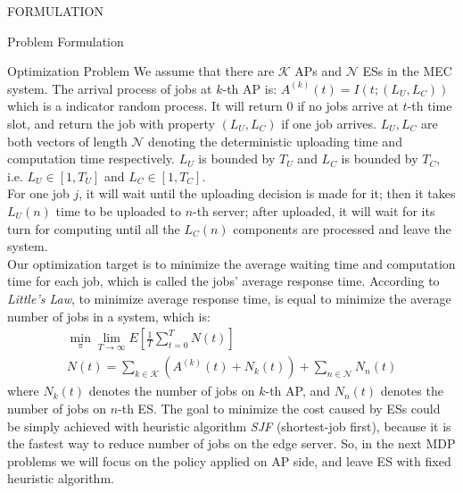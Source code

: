 \documentclass[10pt, conference, letterpaper]{IEEEtran}
\begin{document}
\begin{section}{FORMULATION}
\begin{subsection}{Problem Formulation}
            \begin{subsubsection}{Optimization Problem}
                We assume that there are $\mathcal{K}$ APs and $\mathcal{N}$ ESs in the MEC system.
                The arrival process of jobs at $k$-th AP is: $A^{(k)}(t)=I(t; (L_U, L_C))$ which is a indicator random process. It will return $0$ if no jobs arrive at $t$-th time slot, and return the job with property $(L_U, L_C)$ if one job arrives. $L_U, L_C$ are both vectors of length $\mathcal{N}$ denoting the deterministic uploading time and computation time respectively.
                $L_U$ is bounded by $T_U$ and $L_C$ is bounded by $T_C$, i.e. $L_U \in [1,T_U]$ and $L_C \in [1,T_C]$.
                \\
                For one job $j$, it will wait until the uploading decision is made for it; then it takes $L_U(n)$ time to be uploaded to $n$-th server; after uploaded, it will wait for its turn for computing until all the $L_C(n)$ components are processed and leave the system.
                \\
                Our optimization target is to minimize the average waiting time and computation time for each job, which is called the jobs' average response time. According to \emph{Little’s Law}, to minimize average response time, is equal to minimize the average number of jobs in a system, which is:
                \begin{gather}
                    \min_{\pi} \lim_{T \to \infty} E[\frac{1}{T} \sum_{t=0}^{T} N(t)]
                    \\
                    N(t) = \sum_{k \in \mathcal{K}} (A^{(k)}(t) + N_k(t))
                            + \sum_{n \in \mathcal{N}} N_n(t)
                \end{gather}
                where $N_k(t)$ denotes the number of jobs on $k$-th AP, and $N_n(t)$ denotes the number of jobs on $n$-th ES.
                The goal to minimize the cost caused by ESs could be simply achieved with heuristic algorithm \emph{SJF} (shortest-job first), because it is the fastest way to reduce number of jobs on the edge server. So, in the next MDP problems we will focus on the policy applied on AP side, and leave ES with fixed heuristic algorithm.
            \end{subsubsection}


\end{subsection}
\end{section}
\end{document}
